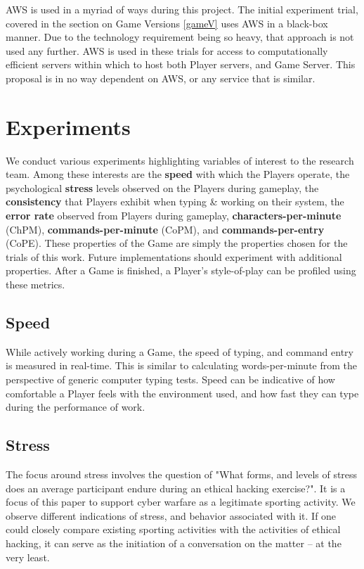 \documentclass[10pt, titlepage, twocolumn]{article}
\newcommand{\ii}{\indent\indent}
\begin{document}
AWS is used in a myriad of ways during this project. The initial experiment trial, covered in the section on Game Versions \ref{gameV} uses AWS in a black-box manner. Due to the technology requirement being so heavy, that approach is not used any further. AWS is used in these trials for access to computationally efficient servers within which to host both Player servers, and Game Server. This proposal is in no way dependent on AWS, or any service that is similar.

\section{Experiments}
We conduct various experiments highlighting variables of interest to the research team. Among these interests are the \textbf{speed} with which the Players operate, the psychological \textbf{stress} levels observed on the Players during gameplay, the \textbf{consistency} that Players exhibit when typing \& working on their system, the \textbf{error rate} observed from Players during gameplay, \textbf{characters-per-minute} (ChPM), \textbf{commands-per-minute} (CoPM), and \textbf{commands-per-entry} (CoPE). These properties of the Game are simply the properties chosen for the trials of this work. Future implementations should experiment with additional properties. After a Game is finished, a Player's style-of-play can be profiled using these metrics.


\subsection{Speed}
\ii
While actively working during a Game, the speed of typing, and command entry is measured in real-time. This is similar to calculating words-per-minute from the perspective of generic computer typing tests. Speed can be indicative of how comfortable a Player feels with the environment used, and how fast they can type during the performance of work.


\subsection{Stress}
\ii
The focus around stress involves the question of "What forms, and levels of stress does an average participant endure during an ethical hacking exercise?". It is a focus of this paper to support cyber warfare as a legitimate sporting activity. We observe different indications of stress, and behavior associated with it. If one could closely compare existing sporting activities with the activities of ethical hacking, it can serve as the initiation of a conversation on the matter -- at the very least.
\end{document}

